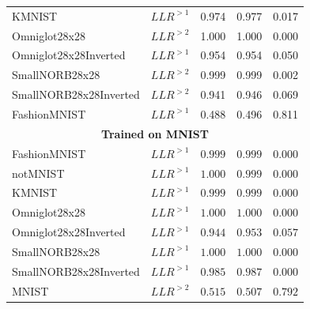 {\begin{columns}
\begin{column}{0.55\textwidth}
\begin{table}[t]
{\begin{tabular}{llrrr}
                    KMNIST                   &  $LLR^{>1}$            &  0.974  &  0.977  &  0.017 \\
                    Omniglot28x28            &  $LLR^{>2}$            &  1.000  &  1.000  &  0.000 \\
                    Omniglot28x28Inverted    &  $LLR^{>1}$            &  0.954  &  0.954  &  0.050 \\
                    SmallNORB28x28           &  $LLR^{>2}$            &  0.999  &  0.999  &  0.002 \\
                    SmallNORB28x28Inverted   &  $LLR^{>2}$            &  0.941  &  0.946  &  0.069 \\
   {\color{black!60}FashionMNIST}             &  $LLR^{>1}$            &  0.488  &  0.496  &  0.811 \\
                    \midrule
                    \multicolumn{5}{c}{\textbf{Trained on MNIST}} \\
                    \midrule
                    FashionMNIST                   &  $LLR^{>1}$  &  $0.999$  &  $0.999$  &  $0.000$ \\
                    notMNIST                       &  $LLR^{>1}$  &  $1.000$  &  $0.999$  &  $0.000$ \\
                    KMNIST                         &  $LLR^{>1}$  &  $0.999$  &  $0.999$  &  $0.000$ \\
                    Omniglot28x28                  &  $LLR^{>1}$  &  $1.000$  &  $1.000$  &  $0.000$ \\
                    Omniglot28x28Inverted          &  $LLR^{>1}$  &  $0.944$  &  $0.953$  &  $0.057$ \\
                    SmallNORB28x28                 &  $LLR^{>1}$  &  $1.000$  &  $1.000$  &  $0.000$ \\
                    SmallNORB28x28Inverted         &  $LLR^{>1}$  &  $0.985$  &  $0.987$  &  $0.000$ \\
   {\color{black!60}MNIST}                          &  $LLR^{>2}$  &  $0.515$  &  $0.507$  &  $0.792$ \\
                    \bottomrule
                \end{tabular}
                }
            \end{table}
            \hfill
        \end{column}
    \end{columns}
}

